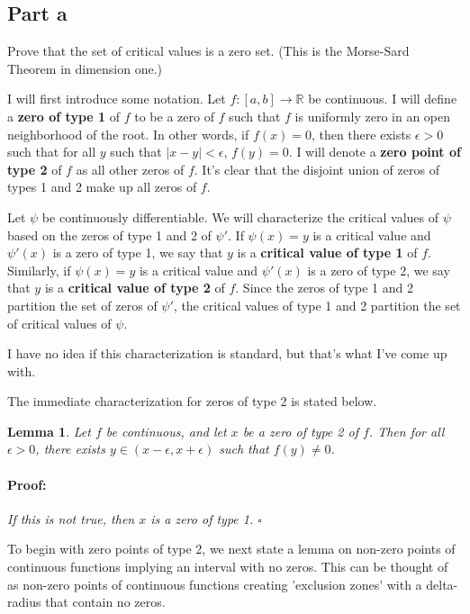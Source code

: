 \documentclass{article}
\newenvironment{proof}{\paragraph{Proof:}}{\hfill$\square$}
\newtheorem{lemma}[theorem]{Lemma}
\newcommand{\R}{\mathbb{R}}
\begin{document}
\subsection*{Part a}

Prove that the set of critical values is a zero set. (This is the Morse-Sard Theorem in dimension one.)

I will first introduce some notation. Let $f: [a, b] \rightarrow \R$ be continuous. I will define a \textbf{zero of type 1} of $f$ to be a zero of $f$ such that $f$ is uniformly zero in an open neighborhood of the root. In other words, if $f(x) = 0$, then there exists $\epsilon > 0$ such that for all $y$ such that $|x-y| < \epsilon$, $f(y) = 0$. I will denote a \textbf{zero point of type 2} of $f$ as all other zeros of $f$. It's clear that the disjoint union of zeros of types 1 and 2 make up all zeros of $f$.

Let $\psi$ be continuously differentiable. We will characterize the critical values of $\psi$ based on the zeros of type 1 and 2 of $\psi'$. If $\psi(x) = y$ is a critical value and $\psi'(x)$ is a zero of type 1, we say that $y$ is a \textbf{critical value of type 1} of $f$. Similarly, if $\psi(x) = y$ is a critical value and $\psi'(x)$ is a zero of type 2, we say that $y$ is a \textbf{critical value of type 2} of $f$. Since the zeros of type 1 and 2 partition the set of zeros of $\psi'$, the critical values of type 1 and 2 partition the set of critical values of $\psi$.

I have no idea if this characterization is standard, but that's what I've come up with.

The immediate characterization for zeros of type 2 is stated below.

\begin{lemma}
\label{ZeroType2ImpliesNonzeroPoint}
Let $f$ be continuous, and let $x$ be a zero of type 2 of $f$. Then for all $\epsilon > 0$, there exists $y \in (x-\epsilon, x + \epsilon)$ such that $f(y) \neq 0$.
\begin{proof}
If this is not true, then $x$ is a zero of type 1.
\end{proof} 
\end{lemma}

To begin with zero points of type 2, we next state a lemma on non-zero points of continuous functions implying an interval with no zeros. This can be thought of as non-zero points of continuous functions creating 'exclusion zones' with a delta-radius that contain no zeros.
\end{document}
